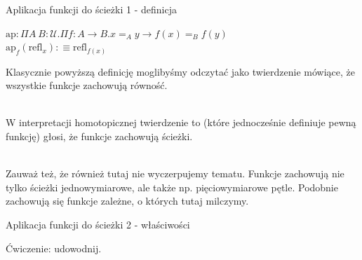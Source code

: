 \documentclass{beamer}
\newcommand{\U}{\mathcal{U}}
\newcommand{\refl}[1]{\text{refl}_{#1}}
\newcommand{\ap}[2]{\text{ap}_{#1}(#2)}
\begin{document}
\begin{frame}{Aplikacja funkcji do ścieżki 1 - definicja}

\begin{definition}

$\text{ap} : \Pi A\ B : \U. \Pi f : A \to B. x =_A y \to f(x) =_B f(y)$ \\
$\ap{f}{\refl{x}} :\equiv \refl{f(x)}$

\end{definition}

Klasycznie powyższą definicję moglibyśmy odczytać jako twierdzenie mówiące, że wszystkie funkcje zachowują równość. \\~\

W interpretacji homotopicznej twierdzenie to (które jednocześnie definiuje pewną funkcję) głosi, że funkcje zachowują ścieżki. \\~\

Zauważ też, że również tutaj nie wyczerpujemy tematu. Funkcje zachowują nie tylko ścieżki jednowymiarowe, ale także np. pięciowymiarowe pętle. Podobnie zachowują się funkcje zależne, o których tutaj milczymy.

\end{frame}

\begin{frame}{Aplikacja funkcji do ścieżki 2 - właściwości}

Ćwiczenie: udowodnij.

\end{frame}
\end{document}
